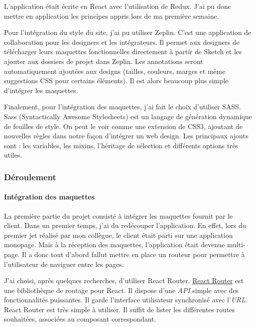 \bigskip

L'application était écrite en React avec l'utilisation de Redux. J'ai pu
donc mettre en application les principes appris lors de ma première
semaine.

\bigskip

Pour l'intégration du style du site, j'ai pu utiliser Zeplin. C'est une
application de collaboration pour les designers et les intégrateurs. Il
permet aux designers de télécharger leurs maquettes fonctionnelles
directement à partir de Sketch et les ajouter aux dossiers de projet
dans Zeplin. Les annotations seront automatiquement ajoutées aux designs
(tailles, couleurs, marges et même suggestions CSS pour certains
éléments). Il est alors beaucoup plus simple d'intégrer les maquettes.

\bigskip

Finalement, pour l'intégration des maquettes, j'ai fait le choix
d'utiliser SASS. Sass (Syntactically Awesome Stylesheets) est un langage
de génération dynamique de feuilles de style. On peut le voir comme une
extension de CSS3, ajoutant de nouvelles règles dans notre façon
d'intégrer un web design. Les principaux ajouts sont : les variables,
les mixins, l'héritage de sélection et différents options très utiles.

\bigskip

\subsubsection{Déroulement}\label{duxe9roulement}

\bigskip

\paragraph{Intégration des
maquettes}\label{intuxe9gration-des-maquettes}

\bigskip

La première partie du projet consisté à intégrer les maquettes fournit
par le client. Dans un premier temps, j'ai du redécouper l'application.
En effet, lors du premier jet réalisé par mon collègue, le client était
parti sur une application monopage. Mais à la réception des maquettes,
l'application était devenue multi-page. Il a donc tout d'abord fallut
mettre en place un routeur pour permettre à l'utilisateur de naviguer
entre les pages.

\bigskip

J'ai choisi, après quelques recherches, d'utiliser React Router.
\href{https://github.com/ReactTraining/react-router}{React Router} est
une bibliothèque de routage pour React. Il dispose d'une \emph{API}
simple avec des fonctionnalités puissantes. Il garde l'interface
utilisateur synchronisé avec l'\emph{URL}. React Router est très simple
à utiliser. Il suffit de lister les différentes routes souhaitées,
associées au composant correspondant.


